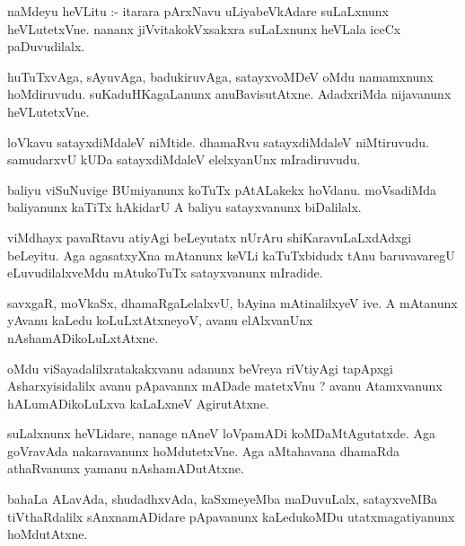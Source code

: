 \documentclass{article}
\begin{document}
\begin{mn}
naMdeyu  heVLitu :- itarara  pArxNavu  uLiyabeVkAdare  suLaLxnunx  heVLutetxVne.  
nananx  jiVvitakokVxsakxra  suLaLxnunx  heVLala  iceCx paDuvudilalx.
\end{mn}

\begin{mn}
huTuTxvAga,  sAyuvAga,  badukiruvAga,  satayxvoMDeV  oMdu  namamxnunx  hoMdiruvudu.  
suKaduHKagaLanunx  anuBavisutAtxne.  AdadxriMda  nijavanunx  heVLutetxVne.
\end{mn}

\begin{mn}
loVkavu  satayxdiMdaleV  niMtide.  dhamaRvu  satayxdiMdaleV  niMtiruvudu.  
samudarxvU  kUDa  satayxdiMdaleV  elelxyanUnx  mIradiruvudu.
\end{mn}

\begin{mn}
baliyu  viSuNuvige  BUmiyanunx  koTuTx  pAtALakekx  hoVdanu.  moVsadiMda  
baliyanunx  kaTiTx  hAkidarU  A  baliyu  satayxvanunx  biDalilalx.
\end{mn}

\begin{mn}
viMdhayx  pavaRtavu  atiyAgi  beLeyutatx  nUrAru  shiKaravuLaLxdAdxgi  beLeyitu.  
Aga  agasatxyXna  mAtanunx  keVLi  kaTuTxbidudx  tAnu  baruvavaregU  
eLuvudilalxveMdu  mAtukoTuTx  satayxvanunx  mIradide.
\end{mn}

\begin{mn}
savxgaR,  moVkaSx,  dhamaRgaLelalxvU,  bAyina  mAtinalilxyeV  ive.  A mAtanunx  
yAvanu  kaLedu koLuLxtAtxneyoV,  avanu  elAlxvanUnx  nAshamADikoLuLxtAtxne.
\end{mn}

\begin{mn}
oMdu viSayadalilxratakakxvanu  adanunx  beVreya  riVtiyAgi  tapApxgi  
Asharxyisidalilx  avanu  pApavannx  mADade  matetxVnu ?  avanu  Atamxvanunx  
hALumADikoLuLxva  kaLaLxneV  AgirutAtxne.
\end{mn}

\begin{mn}
suLalxnunx  heVLidare,  nanage  nAneV  loVpamADi  koMDaMtAgutatxde.  Aga  goVravAda  
nakaravanunx  hoMdutetxVne.  Aga  aMtahavana  dhamaRda  athaRvanunx  yamanu  nAshamADutAtxne.
\end{mn}

\begin{mn}
bahaLa  ALavAda,  shudadhxvAda,  kaSxmeyeMba  maDuvuLalx,  satayxveMBa  tiVthaRdalilx  
sAnxnamADidare  pApavanunx  kaLedukoMDu  utatxmagatiyanunx  hoMdutAtxne.
\end{mn}
\end{document}

